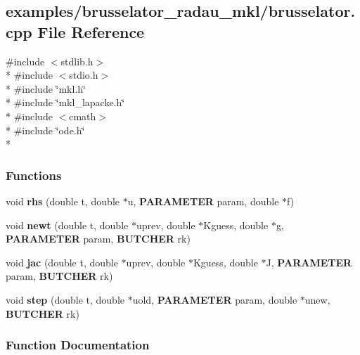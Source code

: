\subsection{examples/brusselator\+\_\+radau\+\_\+mkl/brusselator.cpp File Reference}
\label{brusselator__radau__mkl_2brusselator_8cpp}
{\ttfamily \#include $<$stdlib.\+h$>$}\\*
{\ttfamily \#include $<$stdio.\+h$>$}\\*
{\ttfamily \#include \char`\"{}mkl.\+h\char`\"{}}\\*
{\ttfamily \#include \char`\"{}mkl\+\_\+lapacke.\+h\char`\"{}}\\*
{\ttfamily \#include $<$cmath$>$}\\*
{\ttfamily \#include \char`\"{}ode.\+h\char`\"{}}\\*
\subsubsection*{Functions}
\begin{DoxyCompactItemize}
\item 
void {\bf rhs} (double t, double $\ast$u, {\bf P\+A\+R\+A\+M\+E\+T\+E\+R} param, double $\ast$f)
\item 
void {\bf newt} (double t, double $\ast$uprev, double $\ast$Kguess, double $\ast$g, {\bf P\+A\+R\+A\+M\+E\+T\+E\+R} param, {\bf B\+U\+T\+C\+H\+E\+R} rk)
\item 
void {\bf jac} (double t, double $\ast$uprev, double $\ast$Kguess, double $\ast$J, {\bf P\+A\+R\+A\+M\+E\+T\+E\+R} param, {\bf B\+U\+T\+C\+H\+E\+R} rk)
\item 
void {\bf step} (double t, double $\ast$uold, {\bf P\+A\+R\+A\+M\+E\+T\+E\+R} param, double $\ast$unew, {\bf B\+U\+T\+C\+H\+E\+R} rk)
\end{DoxyCompactItemize}


\subsubsection{Function Documentation}
